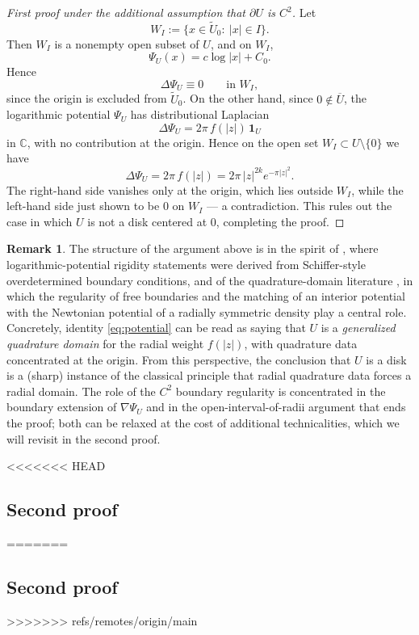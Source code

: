 \documentclass[a4paper,11pt,reqno]{amsart}
\numberwithin{equation}{section}
\theoremstyle{plain} %
\theoremstyle{definition} %
\newtheorem{remark}{Remark}[section]
\theoremstyle{remark}
\newcommand{\C}{\mathbb{C}}
\begin{document}
\begin{proof}[First proof under the additional assumption that $\partial U$ is $C^2$]
Let
\[
W_I:=\{x\in \widetilde U_0:\ |x|\in I\}.
\]
Then \(W_I\) is a nonempty open subset of \(U\), and on \(W_I\),
\[
\Psi_U(x)=c\log|x|+C_0.
\]
Hence
\[
\Delta \Psi_U\equiv 0 \qquad \text{in } W_I,
\]
since the origin is excluded from $\widetilde U_0$. On the other hand,
since $0\notin \overline{U}$, the logarithmic potential $\Psi_U$ has
distributional Laplacian
\[
\Delta \Psi_U=2\pi\, f(|z|)\,\mathbf{1}_U
\]
in $\C$, with no contribution at the origin. Hence on the open set
$W_I\subset U\setminus\{0\}$ we have
\[
\Delta \Psi_U=2\pi\, f(|z|)=2\pi\, |z|^{2k}e^{-\pi |z|^2}.
\]
The right-hand side vanishes only at the origin, which lies outside
$W_I$, while the left-hand side just shown to be $0$ on $W_I$ — a
contradiction. This rules out the case in which $U$ is not a disk
centered at $0$, completing the proof.
\end{proof}

\begin{remark}
The structure of the argument above is in the spirit of
\cite{Aharonov-Schiffer-Zalcman}, where logarithmic-potential
rigidity statements were derived from Schiffer-style overdetermined
boundary conditions, and of the quadrature-domain literature
\cite{Gustafsson,Gustafsson-Shahgholian,Shahgholian,Karp}, in which
the regularity of free boundaries and the matching of an interior
potential with the Newtonian potential of a radially symmetric
density play a central role. Concretely, identity
\eqref{eq:potential} can be read as saying that $U$ is a
\emph{generalized quadrature domain} for the radial weight $f(|z|)$,
with quadrature data concentrated at the origin. From this perspective,
the conclusion that $U$ is a disk is a (sharp) instance of the
classical principle that radial quadrature data forces a radial
domain. The role of the $C^2$ boundary regularity is concentrated
in the boundary extension of $\nabla\Psi_U$ and in the
open-interval-of-radii argument that ends the proof; both can be
relaxed at the cost of additional technicalities, which we will
revisit in the second proof.
\end{remark}

<<<<<<< HEAD
\subsection{Second proof}\label{subsec:second-proof}
=======

\subsection{Second proof}
>>>>>>> refs/remotes/origin/main
\end{document}
